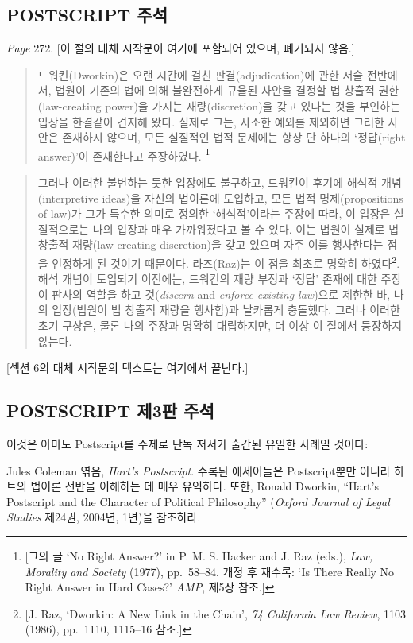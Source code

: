 {\footnotesize

\subsection{POSTSCRIPT 주석}\label{postscript-uxc8fcuxc11d}

\emph{Page} 272. {[}이 절의 대체 시작문이 여기에 포함되어 있으며,
폐기되지 않음.{]}

\begin{quote}
드워킨(Dworkin)은 오랜 시간에 걸친 판결(adjudication)에 관한 저술
전반에서, 법원이 기존의 법에 의해 불완전하게 규율된 사안을 결정할 법
창출적 권한(law-creating power)을 가지는 재량(discretion)을 갖고 있다는
것을 부인하는 입장을 한결같이 견지해 왔다. 실제로 그는, 사소한 예외를
제외하면 그러한 사안은 존재하지 않으며, 모든 실질적인 법적 문제에는 항상
단 하나의 `정답(right answer)'이 존재한다고 주장하였다. \footnote{{[}그의
  글 `No Right Answer?' in P. M. S. Hacker and J. Raz (eds.), \emph{Law,
  Morality and Society} (1977), pp.~58--84. 개정 후 재수록: `Is There
  Really No Right Answer in Hard Cases?' \emph{AMP}, 제5장 참조.{]}}
\end{quote}

\begin{quote}
그러나 이러한 불변하는 듯한 입장에도 불구하고, 드워킨이 후기에 해석적
개념(interpretive ideas)을 자신의 법이론에 도입하고, 모든 법적
명제(propositions of law)가 그가 특수한 의미로 정의한 `해석적'이라는
주장에 따라, 이 입장은 실질적으로는 나의 입장과 매우 가까워졌다고 볼 수
있다. 이는 법원이 실제로 법 창출적 재량(law-creating discretion)을 갖고
있으며 자주 이를 행사한다는 점을 인정하게 된 것이기 때문이다.
라즈(Raz)는 이 점을 최초로 명확히 하였다\footnote{{[}J. Raz, `Dworkin: A
  New Link in the Chain', \emph{74 California Law Review}, 1103 (1986),
  pp.~1110, 1115--16 참조.{]}}. 해석 개념이 도입되기 이전에는, 드워킨의
재량 부정과 `정답' 존재에 대한 주장이 판사의 역할을 하고  것(\emph{discern} and \emph{enforce existing
law})으로 제한한 바, 나의 입장(법원이 법 창출적 재량을 행사함)과
날카롭게 충돌했다. 그러나 이러한 초기 구상은, 물론 나의 주장과 명확히
대립하지만, 더 이상 이 절에서 등장하지 않는다.
\end{quote}

{[}섹션 6의 대체 시작문의 텍스트는 여기에서 끝난다.{]}

\subsection{POSTSCRIPT 제3판
주석}\label{postscript-uxc81c3uxd310-uxc8fcuxc11d}

이것은 아마도 Postscript를 주제로 단독 저서가 출간된 유일한 사례일
것이다:

Jules Coleman 엮음, \emph{Hart's Postscript}. 수록된 에세이들은
Postscript뿐만 아니라 하트의 법이론 전반을 이해하는 데 매우 유익하다.
또한, Ronald Dworkin, ``Hart's Postscript and the Character of Political
Philosophy'' (\emph{Oxford Journal of Legal Studies} 제24권, 2004년,
1면)을 참조하라.

}